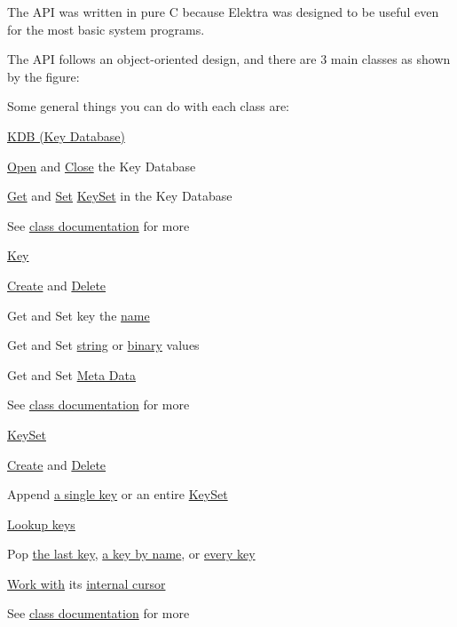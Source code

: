 The A\+P\+I was written in pure C because Elektra was designed to be useful even for the most basic system programs.

The A\+P\+I follows an object-\/oriented design, and there are 3 main classes as shown by the figure\+:

 Some general things you can do with each class are\+:

\hyperlink{group__kdb}{K\+D\+B (Key Database)}


\begin{DoxyItemize}
\item \hyperlink{group__kdb_ga6808defe5870f328dd17910aacbdc6ca}{Open} and \hyperlink{group__kdb_gadb54dc9fda17ee07deb9444df745c96f}{Close} the Key Database
\item \hyperlink{group__kdb_ga28e385fd9cb7ccfe0b2f1ed2f62453a1}{Get} and \hyperlink{group__kdb_ga11436b058408f83d303ca5e996832bcf}{Set} \hyperlink{group__keyset}{Key\+Set} in the Key Database
\item See \hyperlink{group__kdb}{class documentation} for more
\end{DoxyItemize}

\hyperlink{group__key}{Key}
\begin{DoxyItemize}
\item \hyperlink{group__key_gad23c65b44bf48d773759e1f9a4d43b89}{Create} and \hyperlink{group__key_ga3df95bbc2494e3e6703ece5639be5bb1}{Delete}
\item Get and Set key the \hyperlink{group__keyname_ga7699091610e7f3f43d2949514a4b35d9}{name}
\item Get and Set \hyperlink{group__keyvalue_ga622bde1eb0e0c4994728331326340ef2}{string} or \hyperlink{group__keyvalue_gaa50a5358fd328d373a45f395fa1b99e7}{binary} values
\item Get and Set \hyperlink{group__keymeta}{Meta Data}
\item See \hyperlink{group__key}{class documentation} for more
\end{DoxyItemize}

\hyperlink{group__keyset}{Key\+Set}
\begin{DoxyItemize}
\item \hyperlink{group__keyset_ga671e1aaee3ae9dc13b4834a4ddbd2c3c}{Create} and \hyperlink{group__keyset_ga27e5c16473b02a422238c8d970db7ac8}{Delete}
\item Append \hyperlink{group__keyset_gaa5a1d467a4d71041edce68ea7748ce45}{a single key} or an entire \hyperlink{group__keyset_ga21eb9c3a14a604ee3a8bdc779232e7b7}{Key\+Set}
\item \hyperlink{group__keyset_gaa34fc43a081e6b01e4120daa6c112004}{Lookup keys}
\item Pop \hyperlink{group__keyset_gae42530b04defb772059de0600159cf69}{the last key}, \hyperlink{group__keyset_gaa34fc43a081e6b01e4120daa6c112004}{a key by name}, or \hyperlink{group__keyset_gaba1f1dbea191f4d7e7eb3e4296ae7d5e}{every key}
\item \hyperlink{group__keyset_ga317321c9065b5a4b3e33fe1c399bcec9}{Work with} its \hyperlink{group__keyset_ga4287b9416912c5f2ab9c195cb74fb094}{internal cursor}
\item See \hyperlink{group__keyset}{class documentation} for more
\end{DoxyItemize}


